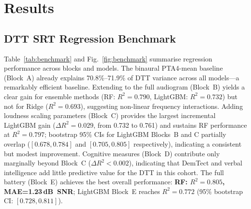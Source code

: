 \documentclass[conference]{IEEEtran}
\begin{document}
\section{Results}

\subsection{DTT SRT Regression Benchmark}

Table~\ref{tab:benchmark} and Fig.~\ref{fig:benchmark} summarise regression
performance across blocks and models.  The binaural PTA4-mean baseline
(Block~A) already explains 70.8\%--71.9\% of DTT variance across all
models---a remarkably efficient baseline.  Extending to the full audiogram
(Block~B) yields a clear gain for ensemble methods (RF: $R^2=0.790$,
LightGBM: $R^2=0.732$) but not for Ridge ($R^2=0.693$), suggesting
non-linear frequency interactions.  Adding loudness scaling parameters
(Block~C) provides the largest incremental LightGBM gain
($\Delta R^2 = 0.029$, from 0.732 to 0.761) and sustains RF performance
at $R^2=0.797$; bootstrap 95\% CIs for LightGBM Blocks~B and C
partially overlap ($[0.678, 0.784]$ and $[0.705, 0.805]$ respectively),
indicating a consistent but modest improvement.  Cognitive measures
(Block~D) contribute only marginally beyond Block~C ($\Delta R^2 < 0.002$),
indicating that DemTect and verbal intelligence add little predictive value
for the DTT in this cohort.  The full battery (Block~E) achieves the best
overall performance: \textbf{RF: $R^2=0.805$, MAE=1.23\,dB~SNR}; LightGBM
Block~E reaches $R^2=0.772$ (95\% bootstrap CI: $[0.728, 0.811]$).
\end{document}
